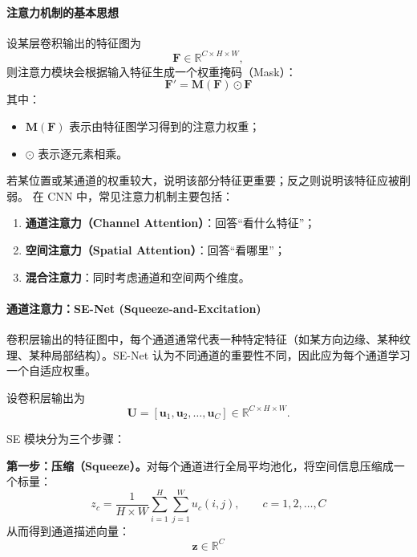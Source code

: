\paragraph{注意力机制的基本思想}

设某层卷积输出的特征图为
\[
\mathbf{F} \in \mathbb{R}^{C \times H \times W},
\]
则注意力模块会根据输入特征生成一个权重掩码（Mask）：
\begin{equation}
\mathbf{F}' = \mathbf{M}(\mathbf{F}) \odot \mathbf{F}
\end{equation}
其中：
\begin{itemize}
    \item $\mathbf{M}(\mathbf{F})$ 表示由特征图学习得到的注意力权重；
    \item $\odot$ 表示逐元素相乘。
\end{itemize}

若某位置或某通道的权重较大，说明该部分特征更重要；反之则说明该特征应被削弱。
在 CNN 中，常见注意力机制主要包括：
\begin{enumerate}
    \item \textbf{通道注意力（Channel Attention）}：回答“看什么特征”；
    \item \textbf{空间注意力（Spatial Attention）}：回答“看哪里”；
    \item \textbf{混合注意力}：同时考虑通道和空间两个维度。
\end{enumerate}

\paragraph{通道注意力：SE-Net (Squeeze-and-Excitation)}
卷积层输出的特征图中，每个通道通常代表一种特定特征（如某方向边缘、某种纹理、某种局部结构）。SE-Net 认为不同通道的重要性不同，因此应为每个通道学习一个自适应权重。

设卷积层输出为
\[
\mathbf{U} = [\mathbf{u}_1,\mathbf{u}_2,\dots,\mathbf{u}_C] \in \mathbb{R}^{C \times H \times W}.
\]

SE 模块分为三个步骤：

\textbf{第一步：压缩（Squeeze）。}对每个通道进行全局平均池化，将空间信息压缩成一个标量：
\begin{equation}
z_c = \frac{1}{H\times W}\sum_{i=1}^{H}\sum_{j=1}^{W} u_c(i,j),
\qquad c=1,2,\dots,C
\end{equation}
从而得到通道描述向量：
\[
\mathbf{z} \in \mathbb{R}^{C}
\]

